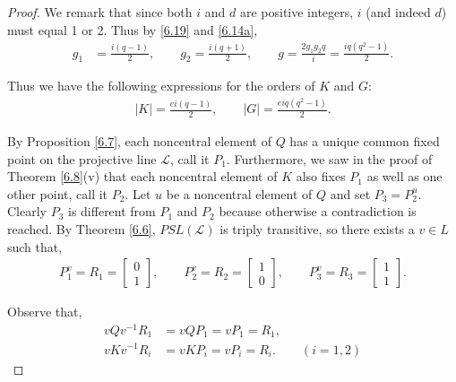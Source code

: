 \documentclass[a4paper , 11pt]{book}
\theoremstyle{definition}
\theoremstyle{remark}
\begin{document}
\begin{proof}
We remark that since both $i$ and $d$ are positive integers, $i$ (and indeed $d$) must equal 1 or 2. Thus by \eqref{6.19} and \eqref{6.14a},
\begin{align*} g_1 &= \frac{i(q-1)}{2}, \qquad g_2 = \frac{i(q + 1)}{2}, \qquad g = \frac{2 g_1 g_2 q}{i} = \frac{iq(q^2 - 1)}{2}.
\end{align*}

Thus we have the following expressions for the orders of $K$ and $G$:
\begin{align}\label{orderGK} |K| = \frac{ei(q-1)}{2}, \qquad |G| = \frac{eiq(q^2-1)}{2}.
\end{align}

By Proposition \ref{6.7}, each noncentral element of $Q$ has a unique common fixed point on the projective line $\mathscr{L}$, call it $P_1$. Furthermore, we saw in the proof of Theorem \ref{6.8}(v) that each noncentral element of $K$ also fixes $P_1$ as well as one other point, call it $P_2$. Let $u$ be a noncentral element of $Q$ and set $P_3 = P_2^u$. Clearly $P_3$ is different from $P_1$ and $P_2$ because otherwise a contradiction is reached. By Theorem \ref{6.6}, $PSL(\mathscr{L})$ is triply transitive, so there exists a $v \in L$ such that,
\begin{align*} P_1^v = R_1 = \begin{bmatrix} 0 \\ 1 \end{bmatrix}, \qquad P_2^v = R_2 = \begin{bmatrix} 1 \\ 0 \end{bmatrix}, \qquad P_3^v = R_3 = \begin{bmatrix} 1 \\ 1 \end{bmatrix}.
\end{align*} 

Observe that,
\begin{align*} vQv^{-1}R_1 &= vQP_1 = vP_1 = R_1,
\\ vKv^{-1}R_i &= vKP_i = vP_i = R_i. \qquad (i=1,2)
\end{align*} 


\end{proof}
\end{document}
